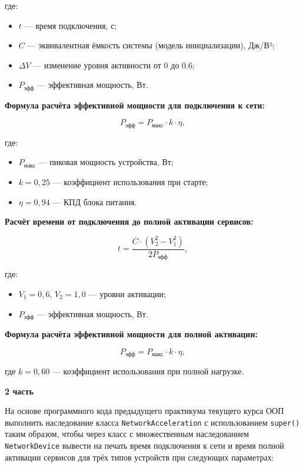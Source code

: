 \begin{enumerate}
где:  
\begin{itemize}
    \item $t$ — время подключения, с;  
    \item $C$ — эквивалентная ёмкость системы (модель инициализации), Дж/В²;  
    \item $\Delta V$ — изменение уровня активности от 0 до 0.6;  
    \item $P_{\text{эфф}}$ — эффективная мощность, Вт.  
\end{itemize}

\textbf{Формула расчёта эффективной мощности для подключения к сети:}

\begin{equation}
P_{\text{эфф}} = P_{\text{макс}} \cdot k \cdot \eta,
\end{equation}

где:  
\begin{itemize}
    \item $P_{\text{макс}}$ — пиковая мощность устройства, Вт;  
    \item $k = 0{,}25$ — коэффициент использования при старте;  
    \item $\eta = 0{,}94$ — КПД блока питания.  
\end{itemize}

\textbf{Расчёт времени от подключения до полной активации сервисов:}

\begin{equation}
t = \frac{C \cdot (V_2^2 - V_1^2)}{2P_{\text{эфф}}},
\end{equation}

где:  
\begin{itemize}
    \item $V_1 = 0{,}6$, $V_2 = 1{,}0$ — уровни активации;  
    \item $P_{\text{эфф}}$ — эффективная мощность, Вт.  
\end{itemize}

\textbf{Формула расчёта эффективной мощности для полной активации:}

\begin{equation}
P_{\text{эфф}} = P_{\text{макс}} \cdot k \cdot \eta,
\end{equation}

где $k = 0{,}60$ — коэффициент использования при полной нагрузке.

\textbf{2 часть}

На основе программного кода предыдущего практикума текущего курса ООП выполнить наследование класса \texttt{NetworkAcceleration} с использованием \texttt{super()} таким образом, чтобы через класс с множественным наследованием \texttt{NetworkDevice} вывести на печать время подключения к сети и время полной активации сервисов для трёх типов устройств при следующих параметрах:


\end{enumerate}
